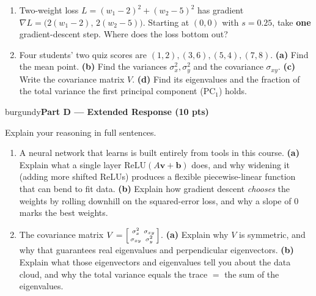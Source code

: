 \documentclass[10pt]{article}
\newcommand{\vv}{\mathbf{v}}
\newcommand{\bb}{\mathbf{b}}
\newcommand{\relu}{\mathrm{ReLU}}
\newcommand{\parthead}[1]{%
  \vspace{6pt}\noindent
  \begin{headlinebox}{burgundy}{\color{white}\bfseries #1}\end{headlinebox}%
  \vspace{4pt}}
\begin{document}
\begin{enumerate}[leftmargin=1.9em, itemsep=12pt]
  \item Two-weight loss $L=(w_1-2)^2+(w_2-5)^2$ has gradient $\nabla L=\big(2(w_1-2),\,2(w_2-5)\big)$.
        Starting at $(0,0)$ with $s=0.25$, take \textbf{one} gradient-descent step. Where does the loss bottom out?
        \vspace{2.8cm}
  \item Four students' two quiz scores are $(1,2),(3,6),(5,4),(7,8)$.
        \textbf{(a)} Find the mean point. \textbf{(b)} Find the variances $\sigma_x^2,\sigma_y^2$ and the covariance $\sigma_{xy}$.
        \textbf{(c)} Write the covariance matrix $V$. \textbf{(d)} Find its eigenvalues and the fraction of the total
        variance the first principal component ($\mathrm{PC}_1$) holds.
        \vspace{3.2cm}
\end{enumerate}

\parthead{Part D --- Extended Response (10 pts)}
Explain your reasoning in full sentences.

\begin{enumerate}[leftmargin=1.9em, itemsep=16pt]
  \item A neural network that learns is built entirely from tools in this course.
        \textbf{(a)} Explain what a single layer $\relu(A\vv+\bb)$ does, and why widening it (adding more shifted ReLUs)
        produces a flexible piecewise-linear function that can bend to fit data.
        \textbf{(b)} Explain how gradient descent \emph{chooses} the weights by rolling downhill on the squared-error loss,
        and why a slope of $0$ marks the best weights.
        \vspace{3.0cm}
  \item The covariance matrix $V=\begin{bsmallmatrix}\sigma_x^2&\sigma_{xy}\\\sigma_{xy}&\sigma_y^2\end{bsmallmatrix}$.
        \textbf{(a)} Explain why $V$ is symmetric, and why that guarantees real eigenvalues and perpendicular eigenvectors.
        \textbf{(b)} Explain what those eigenvectors and eigenvalues tell you about the data cloud, and why the total
        variance equals the trace $=$ the sum of the eigenvalues.
        \vspace{2.8cm}
\end{enumerate}
\end{document}
